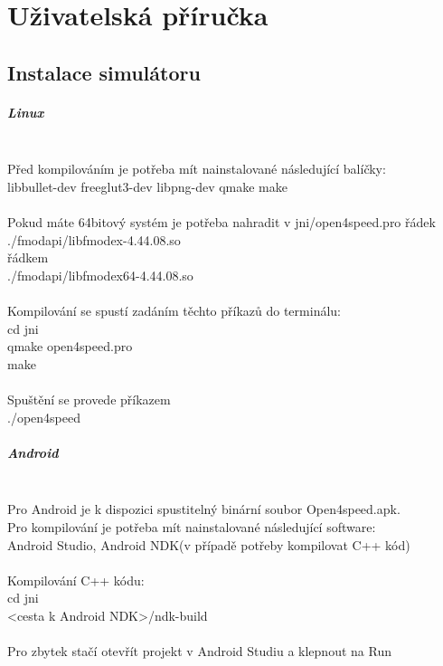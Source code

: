 \documentclass[11pt,twoside,a4paper]{book}
\begin{document}
\chapter{Uživatelská příručka}

\section{Instalace simulátoru}
\paragraph{Linux}\ \ \\
Před kompilováním je potřeba mít nainstalované následující balíčky:\ \ \\
libbullet-dev freeglut3-dev libpng-dev qmake make\ \ \\
\ \ \\
Pokud máte 64bitový systém je potřeba nahradit v jni/open4speed.pro řádek\ \ \\
./fmodapi/libfmodex-4.44.08.so\ \ \\
řádkem\ \ \\
./fmodapi/libfmodex64-4.44.08.so\ \ \\
\ \ \\
Kompilování se spustí zadáním těchto příkazů do terminálu:\ \ \\
cd jni\ \ \\
qmake open4speed.pro\ \ \\
make\ \ \\
\ \ \\
Spuštění se provede příkazem\ \ \\
./open4speed\ \ \\

\paragraph{Android}\ \ \\
Pro Android je k dispozici spustitelný binární soubor Open4speed.apk.\ \ \\
Pro kompilování je potřeba mít nainstalované následující software:\ \ \\
Android Studio, Android NDK(v případě potřeby kompilovat C++ kód)\ \ \\
\ \ \\
Kompilování C++ kódu:\ \ \\
cd jni\ \ \\
<cesta k Android NDK>/ndk-build\ \ \\
\ \ \\
Pro zbytek stačí otevřít projekt v Android Studiu a klepnout na Run
\end{document}
